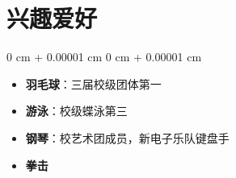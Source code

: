 \documentclass[10pt, letterpaper]{article}
\newenvironment{highlights}{
    \begin{itemize}[
        topsep=0.10 cm,
        parsep=0.10 cm,
        partopsep=0pt,
        itemsep=0pt,
        leftmargin=0 cm + 10pt
    ]
}{
    \end{itemize}
}
\newenvironment{onecolentry}{
    \begin{adjustwidth}{
        0 cm + 0.00001 cm
    }{
        0 cm + 0.00001 cm
    }
}{
    \end{adjustwidth}
}
\begin{document}
    \section{兴趣爱好}
    \begin{onecolentry}
        \begin{highlights}
            \item \textbf{羽毛球}：三届校级团体第一
            \item \textbf{游泳}：校级蝶泳第三
            \item \textbf{钢琴}：校艺术团成员，新电子乐队键盘手
            \item \textbf{拳击}
        \end{highlights}
    \end{onecolentry}
\end{document}
